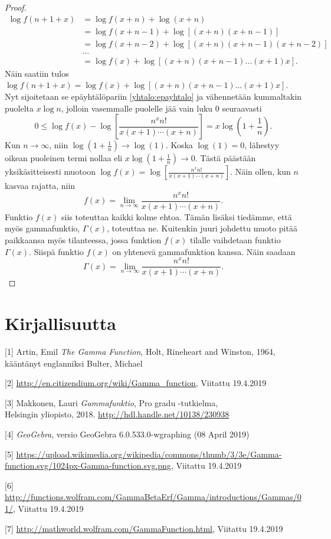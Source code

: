 \documentclass[12pt]{article}
\theoremstyle{definition}
\theoremstyle{plain}
\numberwithin{equation}{section}
\begin{document}
\begin{proof}
\begin{align*}
    \log f(n+1+x) & = \log f(x+n) + \log (x+n) \\
    & = \log f(x+n-1) + \log [(x+n)(x+n-1)] \\
    & = \log f(x+n-2)+\log [(x+n)(x+n-1)(x+n-2)] \\
    & \dots \\
    & = \log f(x) + \log [(x+n)(x+n-1)\dots(x+1)x].
\end{align*}
Näin saatiin tulos $\log f(n+1+x) = \log f(x) + \log [(x+n)(x+n-1)\dots(x+1)x]$. Nyt sijoitetaan se epäyhtälöpariin \eqref{yhtalo:epayhtalo} ja vähennetään kummaltakin puolelta $x\log n$, jolloin vasemmalle puolelle jää vain luku $0$ seuraavasti
\begin{equation*}
    0 \le \log f(x) -\log \left[ \frac{n^xn!}{x(x+1)\cdots(x+n)}\right] = x\log \left(1+\frac{1}{n}\right).
\end{equation*}
Kun $n\rightarrow\infty$, niin $\log (1+\frac{1}{n})\rightarrow \log (1)$. Koska $\log (1)=0$, lähestyy oikean puoleinen termi nollaa eli $x\log (1+\frac{1}{n})\rightarrow 0$. Tästä päästään yksikäsitteisesti muotoon  $\log f(x) = \log \left[\frac{n^xn!}{x(x+1)\cdots(x+n)}\right]$. Näin ollen, kun $n$ kasvaa rajatta, niin
\begin{equation*}
    f(x)=\lim_{n\to\infty} \frac{n^xn!}{x(x+1)\cdots(x+n)}.
\end{equation*}
Funktio $f(x)$ siis toteuttaa kaikki kolme ehtoa. Tämän lisäksi tiedämme, että myös gammafunktio, $\Gamma(x)$, toteuttaa ne. Kuitenkin juuri johdettu muoto pitää paikkaansa myös tilanteessa, jossa funktion $f(x)$ tilalle vaihdetaan funktio $\Gamma(x)$. Siispä funktio $f(x)$ on yhtenevä gammafunktion kanssa. Näin saadaan
\begin{equation*}
    \Gamma(x) = \lim_{n\to\infty}\frac{n^xn!}{x(x+1)\cdots(x+n)}.
\end{equation*}

\end{proof}

\newpage
\doublespacing
\section{Kirjallisuutta}
[1] Artin, Emil \emph{The Gamma Function}, Holt, Rineheart and Winston, 1964, kääntänyt englanniksi Bulter, Michael

[2] \url{http://en.citizendium.org/wiki/Gamma_function}, Viitattu 19.4.2019

[3] Makkonen, Lauri \emph{Gammafunktio}, Pro gradu -tutkielma,\\ Helsingin yliopisto, 2018. \url{http://hdl.handle.net/10138/230938}

[4] \emph{GeoGebra}, versio GeoGebra 6.0.533.0-wgraphing (08 April 2019)

[5] \url{https://upload.wikimedia.org/wikipedia/commons/thumb/3/3e/Gamma-function.svg/1024px-Gamma-function.svg.png}, Viitattu 19.4.2019

[6] \url{http://functions.wolfram.com/GammaBetaErf/Gamma/introductions/Gammas/01/}, Viitattu 19.4.2019

[7] \url{http://mathworld.wolfram.com/GammaFunction.html}, Viitattu 19.4.2019
\end{document}
